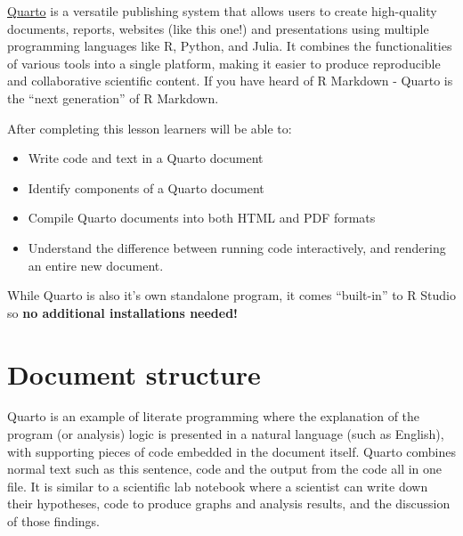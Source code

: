 \documentclass[
  letterpaper,
  DIV=11,
  numbers=noendperiod,
  oneside]{scrreprt}
\providecommand{\tightlist}{%
  \setlength{\itemsep}{0pt}\setlength{\parskip}{0pt}}\usepackage{longtable,booktabs,array}
\begin{document}
\href{https://quarto.org/}{Quarto} is a versatile publishing system that
allows users to create high-quality documents, reports, websites (like
this one!) and presentations using multiple programming languages like
R, Python, and Julia. It combines the functionalities of various tools
into a single platform, making it easier to produce reproducible and
collaborative scientific content. If you have heard of R Markdown -
Quarto is the ``next generation'' of R Markdown.

\begin{tcolorbox}[enhanced jigsaw, bottomrule=.15mm, colback=white, colframe=quarto-callout-note-color-frame, toprule=.15mm, coltitle=black, rightrule=.15mm, opacitybacktitle=0.6, colbacktitle=quarto-callout-note-color!10!white, toptitle=1mm, leftrule=.75mm, breakable, bottomtitle=1mm, titlerule=0mm, title={🎓 Learning Objectives}, arc=.35mm, left=2mm, opacityback=0]

After completing this lesson learners will be able to:

\begin{itemize}
\tightlist
\item
  Write code and text in a Quarto document
\item
  Identify components of a Quarto document
\item
  Compile Quarto documents into both HTML and PDF formats
\item
  Understand the difference between running code interactively, and
  rendering an entire new document.
\end{itemize}

\end{tcolorbox}

While Quarto is also it's own standalone program, it comes ``built-in''
to R Studio so {\textbf{no additional installations needed!}}

\section{Document structure}\label{document-structure}

Quarto is an example of literate programming where the explanation of
the program (or analysis) logic is presented in a natural language (such
as English), with supporting pieces of code embedded in the document
itself. Quarto combines normal text such as this sentence, code and the
output from the code all in one file. It is similar to a scientific lab
notebook where a scientist can write down their hypotheses, code to
produce graphs and analysis results, and the discussion of those
findings.
\end{document}
